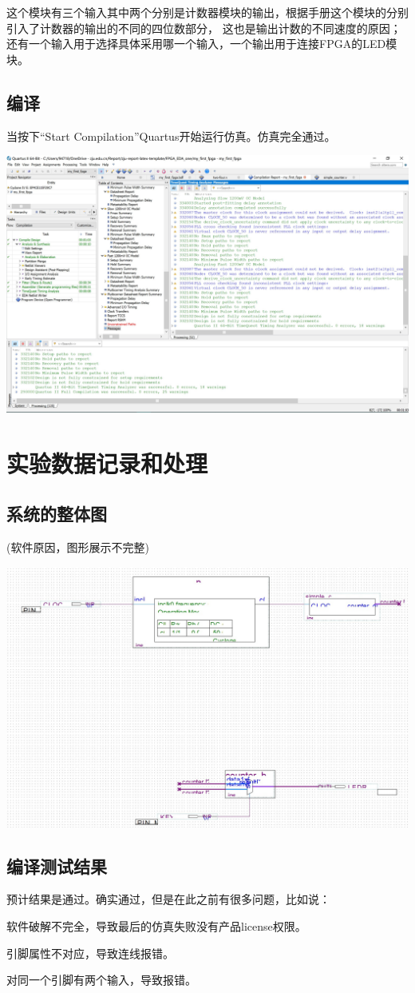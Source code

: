 \documentclass{zjureport}
\begin{document}
    这个模块有三个输入其中两个分别是计数器模块的输出，根据手册这个模块的分别引入了计数器的输出的不同的四位数部分，
    这也是输出计数的不同速度的原因；还有一个输入用于选择具体采用哪一个输入，一个输出用于连接FPGA的LED模块。
  \subsection{编译}
    当按下“Start Compilation”Quartus开始运行仿真。仿真完全通过。
    \begin{center}
      \includegraphics[width=0.6\linewidth]{figures/Compilation.jpg}
    \end{center}
\section{实验数据记录和处理}
  \subsection{系统的整体图}
  (软件原因，图形展示不完整)
  \begin{center}
    \includegraphics[width=0.6\linewidth]{figures/total.jpg}
  \end{center}
  \subsection{编译测试结果}
  预计结果是通过。确实通过，但是在此之前有很多问题，比如说：
  \begin{clause}
    \item 软件破解不完全，导致最后的仿真失败没有产品license权限。
    \item 引脚属性不对应，导致连线报错。
    \item 对同一个引脚有两个输入，导致报错。
  \end{clause}
\end{document}
